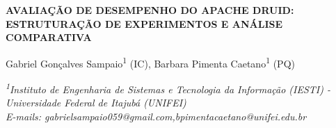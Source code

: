 \begin{singlespace}
\begin{center}
\textbf{AVALIAÇÃO DE DESEMPENHO DO APACHE DRUID: ESTRUTURAÇÃO DE EXPERIMENTOS E ANÁLISE COMPARATIVA}

\vspace{0.55cm}
Gabriel Gonçalves Sampaio\textsuperscript{1} (IC), Barbara Pimenta Caetano\textsuperscript{1} (PQ)

\vspace{0.15cm}
{\fontsize{9}{11}\selectfont\itshape
\textsuperscript{1}Instituto de Engenharia de Sistemas e Tecnologia da Informação (IESTI) - Universidade Federal de Itajubá (UNIFEI)\\
E-mails: gabrielsampaio059@gmail.com,bpimentacaetano@unifei.edu.br}

\end{center}
\end{singlespace}

\vspace{0.3cm}

